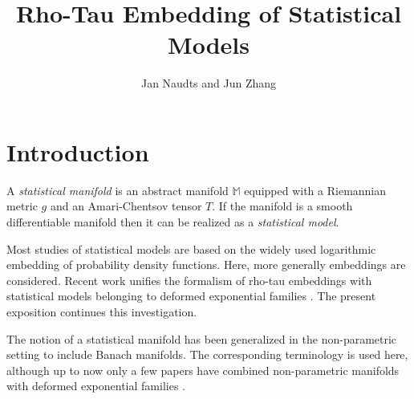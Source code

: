 \documentclass[graybox]{svmult}
\newcommand{\Mo}{\mathbb M}
\begin{document}
\title*{Rho-Tau Embedding of Statistical Models} 
 
\author{Jan Naudts and Jun Zhang}

\maketitle  





\section{Introduction}
\label{sect:intro}

A {\em statistical manifold} \cite{lauritzen1987a,amarinagaoka2000,AyJLS2017}
is an abstract manifold $\Mo$ equipped with a Riemannian metric $g$ and an
Amari-Chentsov tensor $T$. If the manifold is a smooth differentiable manifold
then it can be realized \cite{LeHV2005} as a {\em statistical model}.

Most studies of statistical models are based on the widely used logarithmic embedding of
probability density functions. Here, more generally embeddings are considered.
Recent work \cite{ZN17,NZ17,NZ18} unifies the formalism of rho-tau embeddings \cite{zhang2004a}
with statistical models belonging to deformed exponential families \cite{NJ04}.
The present exposition continues this investigation.  

The notion of a statistical manifold has been generalized in the non-parametric 
setting \cite{pistonesempi1995,pistonerogantin1999}
to include Banach manifolds. The corresponding terminology is used here, although up to now
only a few papers have combined non-parametric manifolds with deformed exponential families
\cite{pistone2009,NNJ12,VigCav2013,MP17}.
\end{document}

